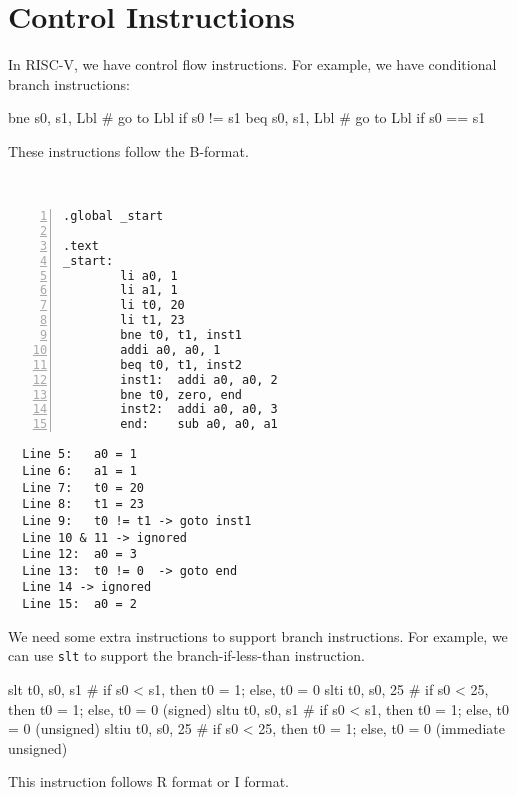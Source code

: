 \section{Control Instructions}
In RISC-V, we have control flow instructions. For example, we have conditional branch instructions:
\begin{codeBlock}
  bne s0, s1, Lbl   # go to Lbl if s0 != s1
  beq s0, s1, Lbl   # go to Lbl if s0 == s1
\end{codeBlock}

These instructions follow the B-format.

\begin{eg}~

\begin{minipage}{0.5\textwidth}
\begin{Verbatim}[numbers=left,xleftmargin=5mm]
.global _start

.text
_start:
        li a0, 1
        li a1, 1
        li t0, 20
        li t1, 23
        bne t0, t1, inst1
        addi a0, a0, 1
        beq t0, t1, inst2
        inst1:  addi a0, a0, 2
        bne t0, zero, end
        inst2:  addi a0, a0, 3
        end:    sub a0, a0, a1
\end{Verbatim}
\end{minipage}
\begin{minipage}{0.5\textwidth}
\color{red}
\begin{verbatim}
  Line 5:   a0 = 1
  Line 6:   a1 = 1
  Line 7:   t0 = 20
  Line 8:   t1 = 23
  Line 9:   t0 != t1 -> goto inst1
  Line 10 & 11 -> ignored
  Line 12:  a0 = 3
  Line 13:  t0 != 0  -> goto end 
  Line 14 -> ignored
  Line 15:  a0 = 2
\end{verbatim}
\end{minipage}
\end{eg}

We need some extra instructions to support branch instructions. For example, we can use \verb|slt| to support the branch-if-less-than instruction.
\begin{codeBlock}
  slt t0, s0, s1      # if s0 < s1, then t0 = 1; else, t0 = 0
  slti t0, s0, 25     # if s0 < 25, then t0 = 1; else, t0 = 0 (signed)
  sltu t0, s0, s1     # if s0 < s1, then t0 = 1; else, t0 = 0 (unsigned)
  sltiu t0, s0, 25    # if s0 < 25, then t0 = 1; else, t0 = 0 (immediate unsigned)
\end{codeBlock}

This instruction follows R format or I format. 

